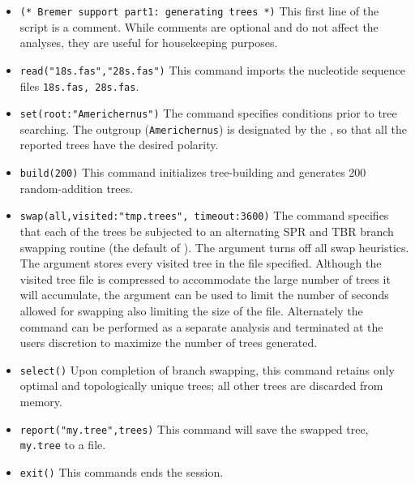 \begin{itemize}
\item \texttt{(* Bremer support part1: generating trees *)} This first line of the script is a comment. While comments
 are optional and do not affect the analyses, they are useful for housekeeping purposes. 
\item \texttt{read("18s.fas","28s.fas")} This command imports the nucleotide sequence files \texttt{18s.fas, 
28s.fas}.
\item \texttt{set(root:"Americhernus")} The  command specifies conditions prior to tree 
searching. The outgroup (\texttt{Americhernus}) is designated by the , so that all the reported 
trees have the desired polarity.     
\item \texttt{build(200)} This command initializes tree-building and generates 200 random-addition trees.      
\item \texttt{swap(all,visited:"tmp.trees", timeout:3600)} The  command specifies that each of 
the trees be subjected to an alternating SPR and TBR branch swapping routine (the default of \poy).  The 
 argument turns off all swap heuristics. The  argument stores 
every visited tree in the file specified.  Although the visited tree file is compressed to accommodate the large 
number of trees it will accumulate, the argument  can be used to limit the number of 
seconds allowed for swapping also limiting the size of the file.  Alternately  the   command 
can be performed as a separate analysis and terminated at the users discretion to maximize the number of trees 
generated.
\item \texttt{select()} Upon completion of branch swapping, this command retains only optimal and topologically
 unique trees; all other trees are discarded from memory. 
\item \texttt{report("my.tree",trees)} This command will save the swapped tree, \\ \texttt{my.tree} to a file. 
\item \texttt{exit()} This commands ends the \poy session.


\end{itemize}
